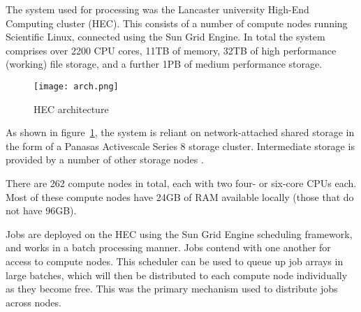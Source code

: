 The system used for processing was the Lancaster university High-End Computing cluster (HEC).  This consists of a number of compute nodes running Scientific Linux, connected using the Sun Grid Engine.  In total the system comprises over 2200 CPU cores, 11TB of memory, 32TB of high performance (working) file storage, and a further 1PB of medium performance storage.


\begin{figure}[h]
\centering
\texttt{[image: arch.png]}
\caption{HEC architecture}
\label{fig:arch}
\end{figure}

As shown in figure~\ref{fig:arch}, the system is reliant on network-attached shared storage in the form of a Panasas Activescale Series 8 storage cluster.  Intermediate storage is provided by a number of other storage nodes .

There are 262 compute nodes in total, each with two four- or six-core CPUs each.  Most of these compute nodes have 24GB of RAM available locally (those that do not have 96GB).

Jobs are deployed on the HEC using the Sun Grid Engine scheduling framework, and works in a batch processing manner.  Jobs contend with one another for access to compute nodes.  This scheduler can be used to queue up job arrays in large batches, which will then be distributed to each compute node individually as they become free.  This was the primary mechanism used to distribute jobs across nodes.

